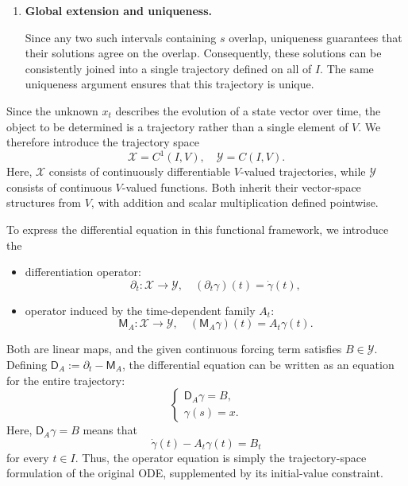 \documentclass[12pt,a4paper,oneside]{book}
\begin{document}
\begin{example}
\begin{solution}
\begin{enumerate}
    \item \textbf{Global extension and uniqueness.}

    Since any two such intervals containing $s$ overlap, uniqueness guarantees that their solutions agree on the overlap.
    Consequently, these solutions can be consistently joined into a single trajectory defined on all of $I$. The same
    uniqueness argument ensures that this trajectory is unique.
\end{enumerate}

Since the unknown $x_t$ describes the evolution of a state vector over time, the object to be determined is a trajectory
rather than a single element of $V$. We therefore introduce the trajectory space
\begin{equation*}
    \mathcal X=C^1(I,V), \quad \mathcal Y=C(I,V).
\end{equation*}
Here, $\mathcal X$ consists of continuously differentiable $V$-valued trajectories, while $\mathcal Y$ consists of continuous
$V$-valued functions. Both inherit their vector-space structures from $V$, with addition and scalar multiplication defined
pointwise.

To express the differential equation in this functional framework, we introduce the
\begin{itemize}
    \item differentiation operator:
        \begin{equation*}
            \partial_t:\mathcal X\to\mathcal Y, \quad (\partial_t\gamma)(t)=\dot{\gamma}(t),
        \end{equation*}
    \item operator induced by the time-dependent family $A_t$:
        \begin{equation*}
            \mathsf M_A:\mathcal X\to\mathcal Y, \quad (\mathsf M_A\gamma)(t)=A_t\gamma(t).
        \end{equation*}
\end{itemize}
Both are linear maps, and the given continuous forcing term satisfies $B\in\mathcal Y$. Defining $\mathsf D_A:=\partial_t-\mathsf M_A$,
the differential equation can be written as an equation for the entire trajectory:
\begin{equation*}
    \left\{
        \begin{aligned}
            \mathsf D_A\gamma=B,\\
            \gamma(s) = x.
        \end{aligned}
    \right.
\end{equation*}
Here, $\mathsf D_A\gamma=B$ means that
\begin{equation*}
    \dot{\gamma}(t)-A_t\gamma(t)=B_t
\end{equation*}
for every $t\in I$. Thus, the operator equation is simply the trajectory-space formulation of the original ODE, supplemented
by its initial-value constraint.


\end{solution}
\end{example}
\end{document}

